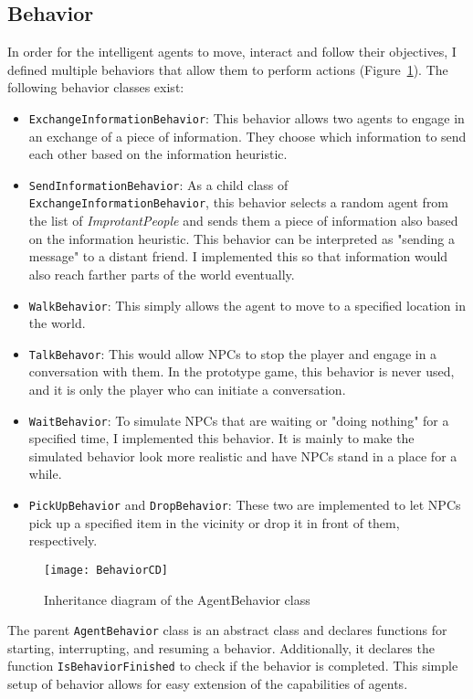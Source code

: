 \subsection{Behavior}
In order for the intelligent agents to move, interact and follow their objectives, I defined multiple behaviors that allow them to perform actions (Figure~\ref{fig:behaviorCD}). The following behavior classes exist:
\begin{itemize}
	\item \verb|ExchangeInformationBehavior|: This behavior allows two agents to engage in an exchange of a piece of information. They choose which information to send each other based on the information heuristic.
	\item \verb|SendInformationBehavior|: As a child class of \verb|ExchangeInformationBehavior|, this behavior selects a random agent from the list of \textit{ImprotantPeople} and sends them a piece of information also based on the information heuristic. This behavior can be interpreted as "sending a message" to a distant friend. I implemented this so that information would also reach farther parts of the world eventually.
	\item \verb|WalkBehavior|: This simply allows the agent to move to a specified location in the world.
	\item \verb|TalkBehavor|: This would allow NPCs to stop the player and engage in a conversation with them. In the prototype game, this behavior is never used, and it is only the player who can initiate a conversation.
	\item \verb|WaitBehavior|: To simulate NPCs that are waiting or "doing nothing" for a specified time, I implemented this behavior. It is mainly to make the simulated behavior look more realistic and have NPCs stand in a place for a while.
	\item \verb|PickUpBehavior| and \verb|DropBehavior|: These two are implemented to let NPCs pick up a specified item in the vicinity or drop it in front of them, respectively.
\end{itemize}
\begin{figure}
	\centering
	\texttt{[image: BehaviorCD]}
	\caption{Inheritance diagram of the AgentBehavior class}
	\label{fig:behaviorCD}
\end{figure}
The parent \verb|AgentBehavior| class is an abstract class and declares functions for starting, interrupting, and resuming a behavior. Additionally, it declares the function \verb|IsBehaviorFinished| to check if the behavior is completed. This simple setup of behavior allows for easy extension of the capabilities of agents.
